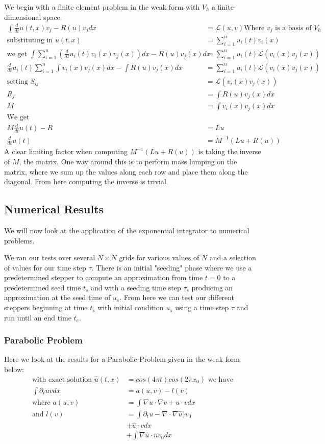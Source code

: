 \documentclass{article}
\begin{document}
We begin with a finite element problem in the weak form with $V_h$ a finite-dimensional space.
\begin{align*}
\int \frac d{dt}u(t,x) v_j - R(u) v_j dx &= \mathcal{L}(u,v)\text{Where $v_j$ is a basis of $V_h$}\\
\text{substituting in } u(t,x) &= \sum_{i=1}^n u_i(t)v_i(x)\\
\text{we get } \int\sum_{i=1}^n(\frac d{dt}u_i(t)v_i(x)v_j(x))dx - R(u)v_j(x)dx &= \sum_{i=1}^n u_i(t)\mathcal{L}(v_i(x)v_j(x))\\
\frac d{dt}u_i(t)\sum_{i=1}^n\int v_i(x)v_j(x)dx - \int R(u)v_j(x)dx &= \sum_{i=1}^n u_i(t)\mathcal{L}(v_i(x)v_j(x))\\
\text{setting } S_{ij} &= \mathcal{L}(v_i(x)v_j(x))\\
R_j &= \int R(u)v_j(x)dx\\
M &= \int v_i(x)v_j(x)dx\\
\text{We get}\\
M\frac d{dt}u(t) - R &= Lu\\
\frac d{dt}u(t) &= M^{-1}(Lu + R(u))
\end{align*}
A clear limiting factor when computing $M^{-1}(Lu + R(u))$ is taking the inverse of $M$, the matrix.
One way around this is to perform mass lumping on the matrix, where we sum up the values along each row and place them along the diagonal.
From here computing the inverse is trivial.

\subsection{Numerical Results}
We will now look at the application of the exponential integrator to numerical problems.

We ran our tests over several $N\times N$ grids for various values of $N$ and a selection of values for our time step $\tau$.
There is an initial "seeding" phase where we use a predetermined stepper to compute an approximation from time $t=0$ to a predetermined seed time $t_s$ and with a seeding time step $\tau_s$ producing an approximation at the seed time of $u_s$.
From here we can test our different steppers beginning at time $t_s$ with initial condition $u_s$ using a time step $\tau$ and run until an end time $t_e$.

\subsubsection{Parabolic Problem}
Here we look at the results for a Parabolic Problem given in the weak form below:
\begin{align*}
\text{with exact solution }\hat u(t,x) &= cos(4\pi t)cos(2\pi x_0) \text{ we have}\\
\int \partial_tu v dx&= a(u,v) - l(v)\\
\text{where }a(u,v) &= \int \nabla u \cdot \nabla v + u \cdot v dx\\
\text{and }l(v) &= \int\partial_tu - \nabla \cdot \nabla \hat u)  v_0\\
&+\hat u \cdot vdx\\
&+\int \nabla \hat u \cdot n v_0 dx
\end{align*}
\end{document}
